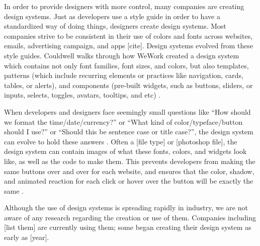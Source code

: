 \documentclass{sigchi}
\begin{document}
In order to provide designers with more control, many companies are creating design systems. Just as developers use a style guide in order to have a standardized way of doing things, designers create design systems. 
Most companies strive to be consistent in their use of colors and fonts across websites, emails, advertising campaign, and apps [cite]. Design systems evolved from these style guides. Couldwell walks through how WeWork created a design system which contains not only font families, font sizes, and colors, but also templates, patterns (which include recurring elements or practices like navigation, cards, tables, or alerts), and components (pre-built widgets, such as buttons, sliders, or inputs, selects, toggles, avatars, tooltips, and etc) \cite{design_system_at_plasma_couldwell_medium_2017}. 




When developers and designers face seemingly small questions like ``How should we format the time/date/currency?'' or ``What kind of color/typeface/button should I use?'' or ``Should this be sentence case or title case?'', the design system can evolve to hold these answers \cite{what_is_design_system_couldwell_medium_2017}. Often a [file type] or [photoshop file], the design system can contain images of what these fonts, colors, and widgets look like, as well as the code to make them. This prevents developers from making the same buttons over and over for each website, and ensures that the color, shadow, and animated reaction for each click or hover over the button will be exactly the same \cite{what_is_design_system_couldwell_medium_2017}. 

Although the use of design systems is spreading rapidly in industry, we are not aware of any research regarding the creation or use of them. Companies including [list them] are currently using them; some began creating their design system as early as [year]. 
\end{document}
